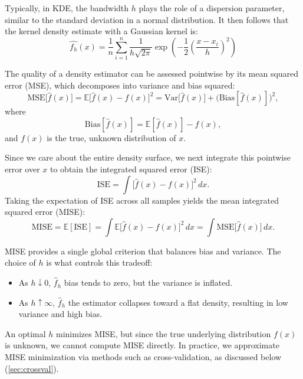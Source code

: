 Typically, in KDE, the bandwidth $h$ plays the role of a dispersion parameter, similar to the standard deviation in a normal distribution. It then follows that the kernel density estimate with a Gaussian kernel is:
$$\displaystyle\hat{f_h}(x)=\frac{1}{n}\sum_{i=1}^{n}\frac{1}{h\sqrt{2\pi}}\exp\left(-\frac{1}{2}\left(\frac{x-x_i}{h}\right)^2\right)$$

The quality of a density estimator can be assessed pointwise by its mean squared error (MSE), which decomposes into variance and bias squared:
$$
\mathrm{MSE}\bigl[\hat f(x)\bigr]
= \mathbb{E}\bigl[\hat f(x)-f(x)\bigr]^2
= \mathrm{Var}\bigl[\hat f(x)\bigr] + \bigl(\mathrm{Bias}[\hat f(x)]\bigr)^2,
$$
where
$$
\mathrm{Bias}[\hat f(x)]
= \mathbb{E}[\hat f(x)] - f(x),
$$
and $f(x)$ is the true, unknown distribution of $x$.

Since we care about the entire density surface, we next integrate this pointwise error over $x$ to obtain the integrated squared error (ISE):
$$
\mathrm{ISE}
= \int \bigl[\hat f(x)-f(x)\bigr]^2\,dx.
$$
Taking the expectation of ISE across all samples yields the mean integrated squared error (MISE):
$$
\mathrm{MISE}
= \mathbb{E}[\mathrm{ISE}]
= \int \mathbb{E}\bigl[\hat f(x)-f(x)\bigr]^2\,dx
= \int \mathrm{MSE}\bigl[\hat f(x)\bigr]\,dx.
$$

MISE provides a single global criterion that balances bias and variance. The choice of $h$ is what controls this tradeoff:

\begin{itemize}
\item As $h\downarrow0$, $\hat f_h$ bias tends to zero, but the variance is inflated.
\item As $h\uparrow\infty$, $\hat f_h$ the estimator collapses toward a flat density, resulting in low variance and high bias.
\end{itemize}

An optimal $h$ minimizes MISE, but since the true underlying distribution $f(x)$ is unknown, we cannot compute MISE directly. In practice, we approximate MISE minimization via methods such as cross-validation, as discussed below (\ref{sec:crossval}).

